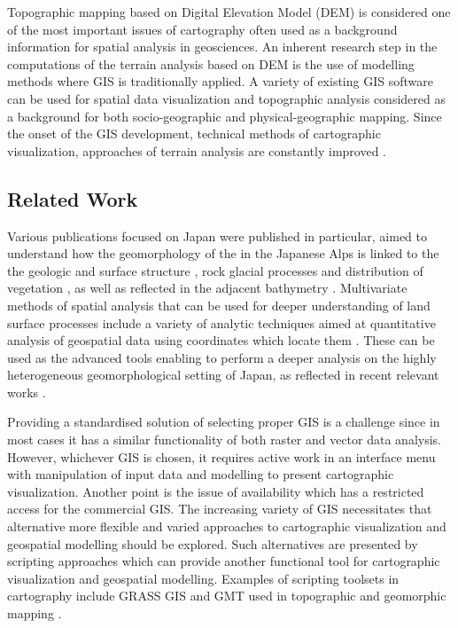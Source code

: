\documentclass[land,article,submit,pdftex,moreauthors]{Definitions/mdpi}
\begin{document}
Topographic mapping based on Digital Elevation Model (DEM) is considered one of the most important issues of cartography often used as a background information for spatial analysis in geosciences. An inherent research step in the computations of the terrain analysis based on DEM is the use of modelling methods where GIS is traditionally applied. A variety of existing GIS software can be used for spatial data visualization and topographic analysis considered as a background for both socio-geographic and physical-geographic mapping. Since the onset of the GIS development, technical methods of cartographic visualization, approaches of terrain analysis are constantly improved \cite{Lam,HUTCHINSON1989211,Deng}. 

\subsection{Related Work}

Various publications focused on Japan were published in particular, aimed to understand how the geomorphology of the in the Japanese Alps is linked to the the geologic and surface structure \cite{MATSUOKA201965}, rock glacial processes \cite{Ono1980} and distribution of vegetation \cite{FUJINO2023100146}, as well as reflected in the adjacent bathymetry \cite{1974607,1980319,Kariya2002}. Multivariate methods of spatial analysis that can be used for deeper understanding of land surface processes include a variety of analytic techniques aimed at quantitative analysis of geospatial data using  coordinates which locate them \cite{Chorley}. These can be used as the advanced tools enabling to perform a deeper analysis on the highly heterogeneous geomorphological setting of Japan, as reflected in recent relevant works \cite{Oguchi2000,OGUCHI2020106805,MATSUURA2015133,NIWA2021107835,HATTANJI2021107943}. 

Providing a standardised solution of selecting proper GIS is a challenge since in most cases it has a similar functionality of both raster and vector data analysis. However, whichever GIS is chosen, it requires active work in an interface menu with manipulation of input data and modelling to present cartographic visualization. Another point is the issue of availability which has a restricted access for the commercial GIS. The increasing variety of GIS necessitates that alternative more flexible and varied approaches to cartographic visualization and geospatial modelling should be explored. Such alternatives are presented by scripting approaches which can provide another functional tool for cartographic visualization and geospatial modelling. Examples of scripting toolsets in cartography include GRASS GIS \cite{Lemenkova202016,Lemenkova202026} and GMT used in topographic and geomorphic mapping \cite{ijgi11090473,geosciences12030140}. 
\end{document}
